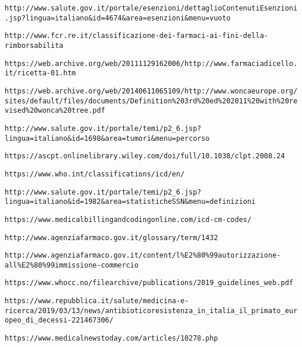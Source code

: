 \begin{thebibliography}{}
	\texttt{http://www.salute.gov.it/portale/esenzioni/dettaglioContenutiEsenzioni.jsp?lingua=italiano\&id=4674\&area=esenzioni\&menu=vuoto}
	
	\texttt{http://www.fcr.re.it/classificazione-dei-farmaci-ai-fini-della-rimborsabilita}
	
	\texttt{https://web.archive.org/web/20111129162006/http://www.farmaciadicello.it/ricetta-01.htm}
	
	\texttt{https://web.archive.org/web/20140611065109/http://www.woncaeurope.org/sites/default/files/documents/Definition\%203rd\%20ed\%202011\%20with\%20revised\%20wonca\%20tree.pdf}
	
	\texttt{http://www.salute.gov.it/portale/temi/p2\_6.jsp?lingua=italiano\&id=1698\&area=tumori\&menu=percorso}
	
	\texttt{https://ascpt.onlinelibrary.wiley.com/doi/full/10.1038/clpt.2008.24}
	
	\texttt{https://www.who.int/classifications/icd/en/}
	
	\texttt{http://www.salute.gov.it/portale/temi/p2\_6.jsp?lingua=italiano\&id=1982\&area=statisticheSSN\&menu=definizioni}
	
	\texttt{https://www.medicalbillingandcodingonline.com/icd-cm-codes/}
	
	\texttt{http://www.agenziafarmaco.gov.it/glossary/term/1432}
	
	\texttt{http://www.agenziafarmaco.gov.it/content/l\%E2\%80\%99autorizzazione-all\%E2\%80\%99immissione-commercio}
	
	\texttt{https://www.whocc.no/filearchive/publications/2019\_guidelines\_web.pdf}
	
	\texttt{https://www.repubblica.it/salute/medicina-e-ricerca/2019/03/13/news/antibioticoresistenza\_in\_italia\_il\_primato\_europeo\_di\_decessi-221467306/}
	
	\texttt{https://www.medicalnewstoday.com/articles/10278.php}
	
\end{thebibliography}
	